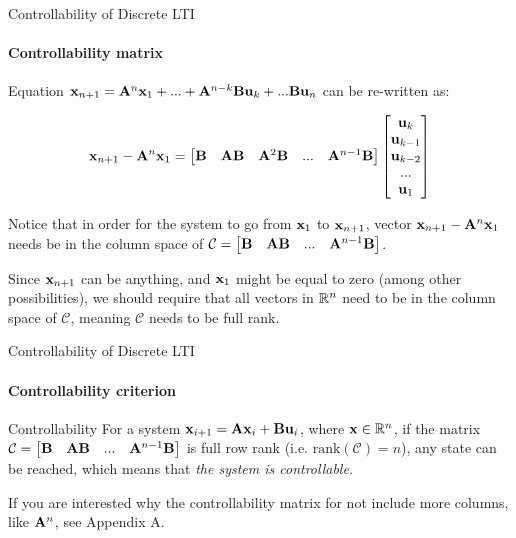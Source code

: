 \documentclass{beamer}
\begin{document}
\begin{frame}{Controllability of Discrete LTI}
\framesubtitle{Controllability matrix}
\begin{flushleft}

Equation $\mathbf{x}_{n+1} = \mathbf{A}^n \mathbf{x}_1 + ... 
+ \mathbf{A}^{n - k} \mathbf{B} \mathbf{u}_{k} + ...
\mathbf{B} \mathbf{u}_n$ can be re-written as:

\begin{equation}
    \mathbf{x}_{n+1} - \mathbf{A}^n \mathbf{x}_1 = 
    \begin{bmatrix}
    \mathbf{B} &
    \mathbf{A} \mathbf{B} &
    \mathbf{A}^2 \mathbf{B} & ... &
    \mathbf{A}^{n - 1} \mathbf{B}
    \end{bmatrix}    
    \begin{bmatrix}
    \mathbf{u}_{k} \\
    \mathbf{u}_{k-1} \\
    \mathbf{u}_{k-2} \\ ... \\
    \mathbf{u}_{1}
    \end{bmatrix}
\end{equation}

Notice that in order for the system to go from $\mathbf{x}_1$ to $\mathbf{x}_{n+1}$, vector $\mathbf{x}_{n+1} - \mathbf{A}^n \mathbf{x}_1$ needs be in the column space of $\mathcal{C} = \begin{bmatrix}
    \mathbf{B} &
    \mathbf{A} \mathbf{B} & ... &
    \mathbf{A}^{n - 1} \mathbf{B}
    \end{bmatrix}$.

Since $\mathbf{x}_{n+1}$ can be anything, and $\mathbf{x}_1$ might be equal to zero (among other possibilities), we should require that all vectors in $\mathbb{R}^n$ need to be in the column space of $\mathcal{C}$, meaning $\mathcal{C}$ needs to be full rank.

\end{flushleft}
\end{frame}


\begin{frame}{Controllability of Discrete LTI}
\framesubtitle{Controllability criterion}
\begin{flushleft}

\begin{block}{Controllability}
For a system $\mathbf{x}_{i+1} = \mathbf{A}  \mathbf{x}_i + \mathbf{B} \mathbf{u}_i$, where $\mathbf{x} \in \mathbb{R}^n$, if the matrix $\mathcal{C} = \begin{bmatrix}
    \mathbf{B} &
    \mathbf{A} \mathbf{B} & ... &
    \mathbf{A}^{n - 1} \mathbf{B}
    \end{bmatrix}$ is full row rank (i.e. $\text{rank}(\mathcal{C}) = n$), any state can be reached, which means that \emph{the system is controllable}.
\end{block}

If you are interested why the controllability matrix for not include more columns, like $\mathbf{A}^n$, see Appendix A.

\end{flushleft}
\end{frame}
\end{document}
